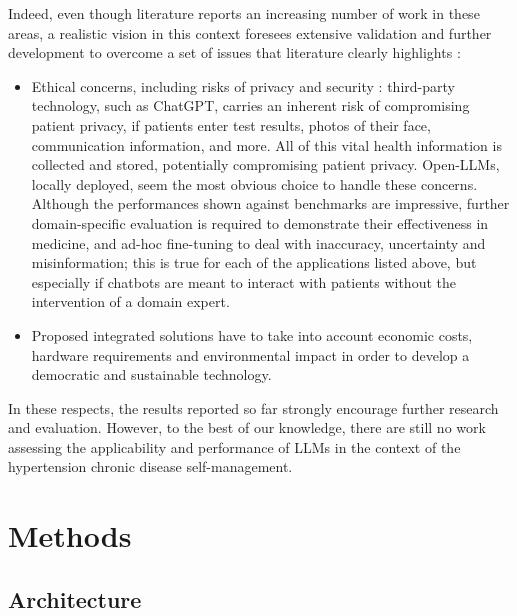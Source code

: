 \documentclass[preprint,12pt]{elsarticle}
\begin{document}
%
Indeed, even though literature reports an increasing number of work in these areas, a realistic vision in this context foresees extensive validation and further development to overcome a set of issues that literature clearly highlights  \cite{Wang2023,Mesko2023}:
%
\begin{itemize}
    \item Ethical concerns, including risks of privacy and security \cite{lancet2023}: third-party technology, such as ChatGPT, carries an inherent risk of compromising patient privacy, if patients enter test results, photos of their face, communication information, and more. All of this vital health information is collected and stored, potentially compromising patient privacy. 
    Open-LLMs, locally deployed, seem the most obvious choice to handle these concerns.
    Although the performances shown against benchmarks are impressive, further domain-specific evaluation is required to demonstrate their effectiveness in medicine, and ad-hoc fine-tuning to deal with inaccuracy, uncertainty and misinformation; this is true for each of the applications listed above, but especially if chatbots are meant to interact with patients without the intervention of a domain expert.
     
    \item Proposed integrated solutions have to take into account economic costs, hardware requirements and environmental impact in order to develop a democratic and sustainable technology.
    
\end{itemize}
%
In these respects, the results reported so far strongly encourage further research and evaluation. 
%
However, to the best of our knowledge, there are still no work assessing the applicability and performance of LLMs in the context of the hypertension chronic disease self-management.

\section{Methods}



\subsection{Architecture}\label{subsec:archi}
\end{document}
